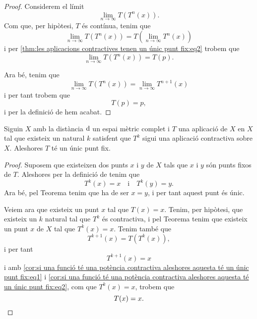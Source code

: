 \documentclass[../Apunts.tex]{subfiles}
\begin{document}
\begin{theorem}
\begin{proof}
			Considerem el límit
			\[\lim_{n\to\infty}T(T^{n}(x)).\]
			Com que, per hipòtesi, \(T\) és contínua, tenim que %
			\[\lim_{n\to\infty}T(T^{n}(x))=T\left(\lim_{n\to\infty}T^{n}(x)\right)\]
			i per \eqref{thm:les aplicacions contractives tenen un únic punt fix:eq2} trobem que
			\[\lim_{n\to\infty}T(T^{n}(x))=T(p).\]
			
			Ara bé, tenim que 
			\[\lim_{n\to\infty}T(T^{n}(x))=\lim_{n\to\infty}T^{n+1}(x)\]
			i per tant trobem que
			\[T(p)=p,\]
			i per la definició de  hem acabat.
		\end{proof}
	\end{theorem}
	\begin{corollary}
		\label{cor:si una funció té una potència contractiva aleshores aquesta té un únic punt fix}
		Siguin \(X\) amb la distància \(\operatorname{d}\) un espai mètric complet i \(T\) una aplicació de \(X\) en \(X\) tal que existeix un natural \(k\) satisfent que \(T^{k}\) sigui una aplicació contractiva sobre \(X\). Aleshores \(T\) té un únic punt fix.
		\begin{proof}
			Suposem que existeixen dos punts \(x\) i \(y\) de \(X\) tals que \(x\) i \(y\) són punts fixos de \(T\). Aleshores per la definició de  tenim que
			\[T^{k}(x)=x\quad\text{i}\quad T^{k}(y)=y.\]
			Ara bé, pel Teorema  tenim que ha de ser \(x=y\), i per tant aquest punt és únic. %
			
			Veiem ara que existeix un punt \(x\) tal que \(T(x)=x\). Tenim, per hipòtesi, que existeix un \(k\) natural tal que \(T^{k}\) és contractiva, i pel Teorema  tenim que existeix un punt \(x\) de \(X\) tal que \(T^{k}(x)=x\). Tenim també que
			\begin{equation}
				\label{cor:si una funció té una potència contractiva aleshores aquesta té un únic punt fix:eq1}
				T^{k+1}(x)=T(T^{k}(x)),
			\end{equation}
			i per tant
			\begin{equation}
				\label{cor:si una funció té una potència contractiva aleshores aquesta té un únic punt fix:eq2}
				T^{k+1}(x)=x
			\end{equation}
			i amb \eqref{cor:si una funció té una potència contractiva aleshores aquesta té un únic punt fix:eq1} i \eqref{cor:si una funció té una potència contractiva aleshores aquesta té un únic punt fix:eq2}, com que \(T^{k}(x)=x\), trobem que
			\[T(x)=x.\qedhere\]
		\end{proof}
	\end{corollary}
\end{document}
